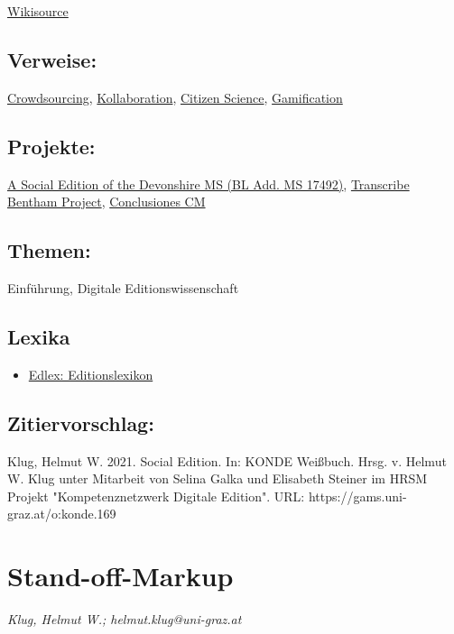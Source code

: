 \documentclass{article}
\begin{document}
\href{http://en.wikisource.org/wiki/Main_Page}{Wikisource}\subsection*{Verweise:}\href{https://gams.uni-graz.at/o:konde.47}{Crowdsourcing}, \href{https://gams.uni-graz.at/o:konde.104}{Kollaboration}, \href{https://gams.uni-graz.at/o:konde.41}{Citizen Science}, \href{https://gams.uni-graz.at/o:konde.89}{Gamification}\subsection*{Projekte:}\href{https://en.wikibooks.org/wiki/The_Devonshire_Manuscript}{A Social Edition of the Devonshire MS (BL Add. MS 17492)}, \href{https://www.ucl.ac.uk/bentham-project/}{Transcribe Bentham Project}, \href{http://cds.library.brown.edu/projects/pico/}{Conclusiones CM}\subsection*{Themen:}Einführung, Digitale Editionswissenschaft\subsection*{Lexika}\begin{itemize}\item \href{https://edlex.de/index.php?title=Social_Editing}{Edlex: Editionslexikon}\end{itemize}\subsection*{Zitiervorschlag:}Klug, Helmut W. 2021. Social Edition. In: KONDE Weißbuch. Hrsg. v. Helmut W. Klug unter Mitarbeit von Selina Galka und Elisabeth Steiner im HRSM Projekt "Kompetenznetzwerk Digitale Edition". URL: https://gams.uni-graz.at/o:konde.169\newpage\section*{Stand-off-Markup} \emph{Klug, Helmut W.; helmut.klug@uni-graz.at}\\
        
\end{document}
